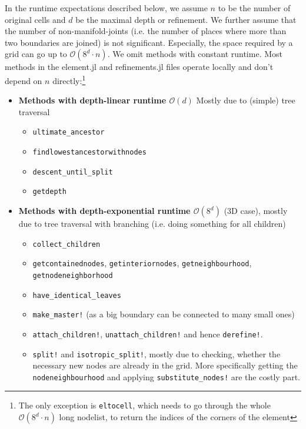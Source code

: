 \documentclass{article}
\begin{document}
In the runtime expectations described below, we assume $n$ to be the number of original cells and $d$ be the maximal depth or refinement. We further assume that the number of non-manifold-joints (i.e. the number of places where more than two boundaries are joined) is not significant. Especially, the space required by a grid can go up to $\mathcal O(8^d\cdot n)$. We omit methods with constant runtime. Most methods in the element.jl and refinements.jl files operate locally and don't depend on $n$ directly:\footnote{The only exception is \texttt{eltocell}, which needs to go through the whole $\mathcal{O}(8^d \cdot n)$ long nodelist, to return the indices of the corners of the element}
\begin{itemize}
    \item {\bf Methods with depth-linear runtime  $\mathcal O(d)$} Mostly due to (simple) tree traversal
    \begin{itemize}
        \item \texttt{ultimate\_ancestor}
        \item \texttt{findlowestancestorwithnodes}
        \item \texttt{descent\_until\_split}
        \item \texttt{getdepth}
    \end{itemize}
    \item {\bf Methods with depth-exponential runtime $\mathcal O(8^d)$ } (3D case), mostly due to tree traversal with branching (i.e. doing something for all children)
        \begin{itemize}
        \item \texttt{collect\_children}
        \item \texttt{getcontainednodes}, \texttt{getinteriornodes}, \texttt{getneighbourhood}, \texttt{getnodeneighborhood}
        \item \texttt{have\_identical\_leaves}
        \item \texttt{make\_master!} (as a big boundary can be connected to many small ones)
        \item \texttt{attach\_children!}, \texttt{unattach\_children!} and hence \texttt{derefine!}.
        \item \texttt{split!} and \texttt{isotropic\_split!}, mostly due to checking, whether the necessary new nodes are already in the grid. More specifically getting the \texttt{nodeneighbourhood} and applying \texttt{substitute\_nodes!} are the costly part.
        \end{itemize}
\end{itemize}
\end{document}
